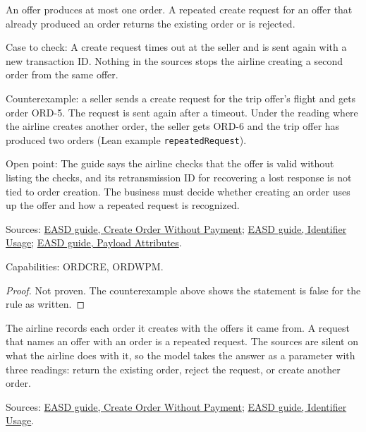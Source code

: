 \begin{theorem}
  \label{thm:order-creation-offer-used-once}
  An offer produces at most one order. A repeated create request for an
  offer that already produced an order returns the existing order or is
  rejected.

  Case to check: A create request times out at the seller and is sent again
  with a new transaction ID. Nothing in the sources stops the airline
  creating a second order from the same offer.

  Counterexample: a seller sends a create request for the trip offer's
  flight and gets order ORD-5.  The request is sent again after a timeout.
  Under the reading where the airline creates another order, the seller gets
  ORD-6 and the trip offer has produced two orders (Lean example
  \texttt{repeatedRequest}).

  Open point: The guide says the airline checks that the offer is valid
  without listing the checks, and its retransmission ID for recovering a
  lost response is not tied to order creation. The business must decide
  whether creating an order uses up the offer and how a repeated request is
  recognized.

  Sources: \href{https://standards.atlassian.net/wiki/spaces/EASD/pages/574455879/Create+Order+Without+Payment}{EASD guide, Create Order Without Payment};
  \href{https://standards.atlassian.net/wiki/spaces/EASD/pages/574226512/Identifier+Usage}{EASD guide, Identifier Usage};
  \href{https://standards.atlassian.net/wiki/spaces/EASD/pages/574619693/Payload+Attributes}{EASD guide, Payload Attributes}.

  Capabilities: ORDCRE, ORDWPM.
\end{theorem}
\begin{proof}
  Not proven.  The counterexample above shows the statement is false for the
  rule as written.
\end{proof}

\begin{definition}
  \label{def:order-creation-repeat}
  The airline records each order it creates with the offers it came from.  A
  request that names an offer with an order is a repeated request.  The
  sources are silent on what the airline does with it, so the model takes the
  answer as a parameter with three readings: return the existing order,
  reject the request, or create another order.

  Sources: \href{https://standards.atlassian.net/wiki/spaces/EASD/pages/574455879/Create+Order+Without+Payment}{EASD guide, Create Order Without Payment};
  \href{https://standards.atlassian.net/wiki/spaces/EASD/pages/574226512/Identifier+Usage}{EASD guide, Identifier Usage}.
\end{definition}

